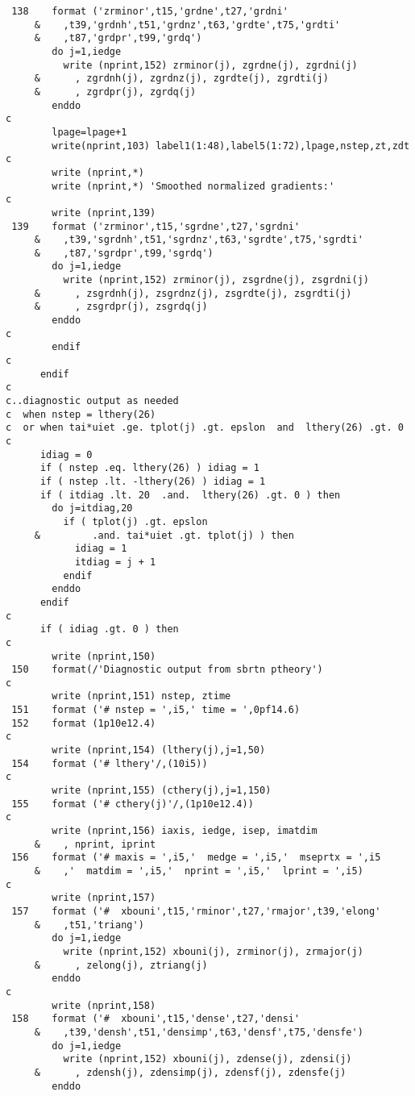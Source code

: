 \begin{verbatim}
 138    format ('zrminor',t15,'grdne',t27,'grdni'
     &    ,t39,'grdnh',t51,'grdnz',t63,'grdte',t75,'grdti'
     &    ,t87,'grdpr',t99,'grdq')
        do j=1,iedge
          write (nprint,152) zrminor(j), zgrdne(j), zgrdni(j)
     &      , zgrdnh(j), zgrdnz(j), zgrdte(j), zgrdti(j)
     &      , zgrdpr(j), zgrdq(j)
        enddo
c
        lpage=lpage+1
        write(nprint,103) label1(1:48),label5(1:72),lpage,nstep,zt,zdt
c
        write (nprint,*)
        write (nprint,*) 'Smoothed normalized gradients:'
c
        write (nprint,139)
 139    format ('zrminor',t15,'sgrdne',t27,'sgrdni'
     &    ,t39,'sgrdnh',t51,'sgrdnz',t63,'sgrdte',t75,'sgrdti'
     &    ,t87,'sgrdpr',t99,'sgrdq')
        do j=1,iedge
          write (nprint,152) zrminor(j), zsgrdne(j), zsgrdni(j)
     &      , zsgrdnh(j), zsgrdnz(j), zsgrdte(j), zsgrdti(j)
     &      , zsgrdpr(j), zsgrdq(j)
        enddo
c
        endif
c
      endif
c
c..diagnostic output as needed
c  when nstep = lthery(26)
c  or when tai*uiet .ge. tplot(j) .gt. epslon  and  lthery(26) .gt. 0
c
      idiag = 0
      if ( nstep .eq. lthery(26) ) idiag = 1
      if ( nstep .lt. -lthery(26) ) idiag = 1
      if ( itdiag .lt. 20  .and.  lthery(26) .gt. 0 ) then
        do j=itdiag,20
          if ( tplot(j) .gt. epslon
     &         .and. tai*uiet .gt. tplot(j) ) then
            idiag = 1
            itdiag = j + 1
          endif
        enddo
      endif
c
      if ( idiag .gt. 0 ) then
c
        write (nprint,150)
 150    format(/'Diagnostic output from sbrtn ptheory')
c
        write (nprint,151) nstep, ztime
 151    format ('# nstep = ',i5,' time = ',0pf14.6)
 152    format (1p10e12.4)
c
        write (nprint,154) (lthery(j),j=1,50)
 154    format ('# lthery'/,(10i5))
c
        write (nprint,155) (cthery(j),j=1,150)
 155    format ('# cthery(j)'/,(1p10e12.4))
c
        write (nprint,156) iaxis, iedge, isep, imatdim
     &    , nprint, iprint
 156    format ('# maxis = ',i5,'  medge = ',i5,'  mseprtx = ',i5
     &    ,'  matdim = ',i5,'  nprint = ',i5,'  lprint = ',i5)
c
        write (nprint,157)
 157    format ('#  xbouni',t15,'rminor',t27,'rmajor',t39,'elong'
     &    ,t51,'triang')
        do j=1,iedge
          write (nprint,152) xbouni(j), zrminor(j), zrmajor(j)
     &      , zelong(j), ztriang(j)
        enddo
c
        write (nprint,158)
 158    format ('#  xbouni',t15,'dense',t27,'densi'
     &    ,t39,'densh',t51,'densimp',t63,'densf',t75,'densfe')
        do j=1,iedge
          write (nprint,152) xbouni(j), zdense(j), zdensi(j)
     &      , zdensh(j), zdensimp(j), zdensf(j), zdensfe(j)
        enddo

\end{verbatim}
